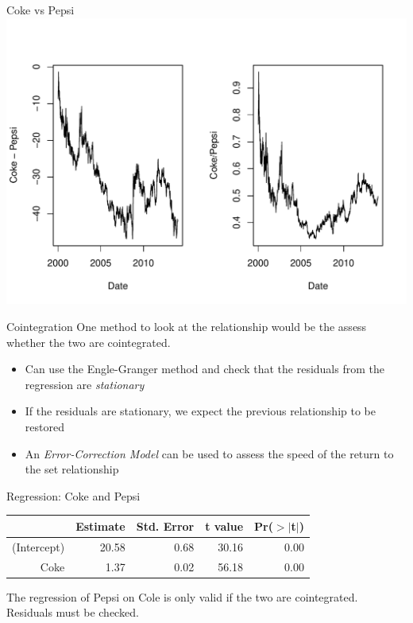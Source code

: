\documentclass[14pt,xcolor=pdftex,dvipsnames,table]{beamer}\usepackage{graphicx, color}
\makeatletter
\def\maxwidth{ %
  \ifdim\Gin@nat@width>\linewidth
    \linewidth
  \else
    \Gin@nat@width
  \fi
}
\newenvironment{knitrout}{}{} %
\makeatother
\begin{document}
\begin{frame}{Coke vs Pepsi}
\begin{knitrout}
\color{fgcolor}
\includegraphics[width=\maxwidth]{figure/CvP} 

\end{knitrout}

\end{frame}

\begin{frame}{Cointegration}
One method to look at the relationship would be the assess whether the two are cointegrated.
\begin{itemize}[<+-| alert@+>]
\item Can use the Engle-Granger method and check that the residuals from the regression are \emph{stationary}
\item If the residuals are stationary, we expect the previous relationship to be restored
\item An \emph{Error-Correction Model} can be used to assess the speed of the return to the set relationship
\end{itemize}
\end{frame}
\begin{frame}{Regression: Coke and Pepsi}
\begin{table}[ht]
\centering
\begin{tabular}{rrrrr}
  \hline
 & Estimate & Std. Error & t value & Pr($>$$|$t$|$) \\ 
  \hline
(Intercept) & 20.58 & 0.68 & 30.16 & 0.00 \\ 
  Coke & 1.37 & 0.02 & 56.18 & 0.00 \\ 
   \hline
\end{tabular}
\end{table}

The regression of Pepsi on Cole is only valid if the two are cointegrated.  Residuals must be checked. 

\end{frame}
\end{document}

